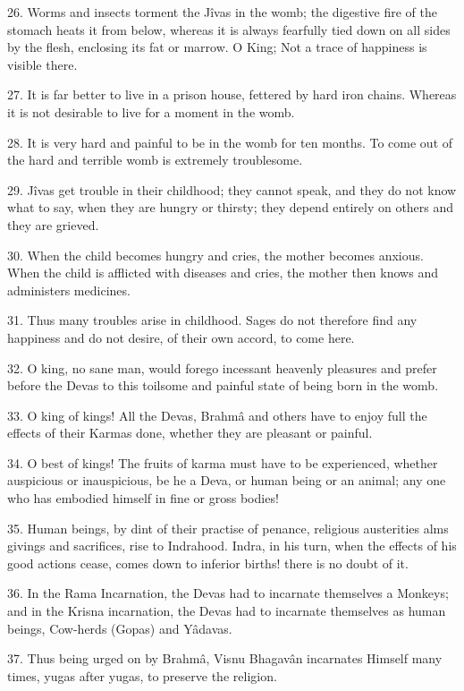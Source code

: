 26. Worms and insects torment the J\^ivas in the womb; the digestive fire of the stomach heats it from below, whereas it is always fearfully tied down on all sides by the flesh, enclosing its fat or marrow. O King; Not a trace of happiness is visible there.

27. It is far better to live in a prison house, fettered by hard iron chains. Whereas it is not desirable to live for a moment in the womb.

28. It is very hard and painful to be in the womb for ten months. To come out of the hard and terrible womb is extremely troublesome.

29. J\^ivas get trouble in their childhood; they cannot speak, and they do not know what to say, when they are hungry or thirsty; they depend entirely on others and they are grieved.

30. When the child becomes hungry and cries, the mother becomes anxious. When the child is afflicted with diseases and cries, the mother then knows and administers medicines.

31. Thus many troubles arise in childhood. Sages do not therefore find any happiness and do not desire, of their own accord, to come here.

32. O king, no sane man, would forego incessant heavenly pleasures and prefer before the Devas to this toilsome and painful state of being born in the womb.

33. O king of kings! All the Devas, Brahm\^a and others have to enjoy full the effects of their Karmas done, whether they are pleasant or painful.

34. O best of kings! The fruits of karma must have to be experienced, whether auspicious or inauspicious, be he a Deva, or human being or an animal; any one who has embodied himself in fine or gross bodies!

35. Human beings, by dint of their practise of penance, religious austerities alms givings and sacrifices, rise to Indrahood. Indra, in his turn, when the effects of his good actions cease, comes down to inferior births! there is no doubt of it.

36. In the Rama Incarnation, the Devas had to incarnate themselves a Monkeys; and in the Krisna incarnation, the Devas had to incarnate themselves as human beings, Cow-herds (Gopas) and Y\^adavas.

37. Thus being urged on by Brahm\^a, Visnu Bhagav\^an incarnates Himself many times, yugas after yugas, to preserve the religion.

